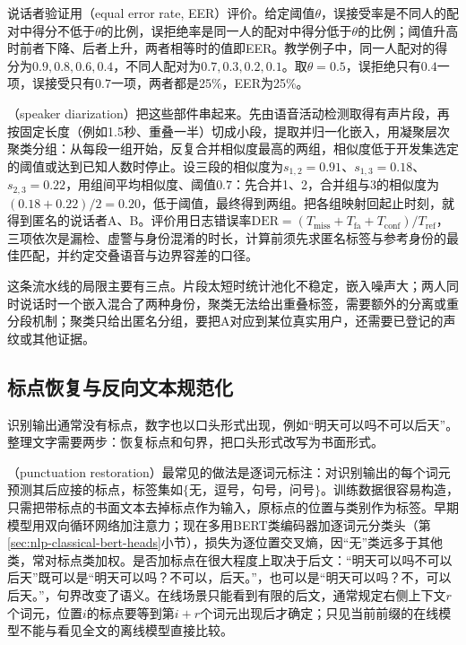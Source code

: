 说话者验证用（equal error rate, EER）评价。给定阈值$\theta$，误接受率是不同人的配对中得分不低于$\theta$的比例，误拒绝率是同一人的配对中得分低于$\theta$的比例；阈值升高时前者下降、后者上升，两者相等时的值即EER。教学例子中，同一人配对的得分为$0.9,0.8,0.6,0.4$，不同人配对为$0.7,0.3,0.2,0.1$。取$\theta=0.5$，误拒绝只有$0.4$一项，误接受只有$0.7$一项，两者都是25\%，EER为25\%。

（speaker diarization）把这些部件串起来。先由语音活动检测取得有声片段，再按固定长度（例如1.5秒、重叠一半）切成小段，提取并归一化嵌入，用凝聚层次聚类分组：从每段一组开始，反复合并相似度最高的两组，相似度低于开发集选定的阈值或达到已知人数时停止。设三段的相似度为$s_{1,2}=0.91$、$s_{1,3}=0.18$、$s_{2,3}=0.22$，用组间平均相似度、阈值$0.7$：先合并1、2，合并组与3的相似度为$(0.18+0.22)/2=0.20$，低于阈值，最终得到两组。把各组映射回起止时刻，就得到匿名的说话者A、B。评价用日志错误率$\mathrm{DER}=(T_{\mathrm{miss}}+T_{\mathrm{fa}}+T_{\mathrm{conf}})/T_{\mathrm{ref}}$，三项依次是漏检、虚警与身份混淆的时长，计算前须先求匿名标签与参考身份的最佳匹配，并约定交叠语音与边界容差的口径。

这条流水线的局限主要有三点。片段太短时统计池化不稳定，嵌入噪声大；两人同时说话时一个嵌入混合了两种身份，聚类无法给出重叠标签，需要额外的分离或重分段机制；聚类只给出匿名分组，要把A对应到某位真实用户，还需要已登记的声纹或其他证据。

\subsection{标点恢复与反向文本规范化}
\label{sec:nlp-speech-itn}

识别输出通常没有标点，数字也以口头形式出现，例如“明天可以吗不可以后天”。整理文字需要两步：恢复标点和句界，把口头形式改写为书面形式。

（punctuation restoration）最常见的做法是逐词元标注：对识别输出的每个词元预测其后应接的标点，标签集如$\{$无，逗号，句号，问号$\}$。训练数据很容易构造，只需把带标点的书面文本去掉标点作为输入，原标点的位置与类别作为标签。早期模型用双向循环网络加注意力；现在多用BERT类编码器加逐词元分类头（第\ref{sec:nlp-classical-bert-heads}小节），损失为逐位置交叉熵，因“无”类远多于其他类，常对标点类加权。是否加标点在很大程度上取决于后文：“明天可以吗不可以后天”既可以是“明天可以吗？不可以，后天。”，也可以是“明天可以吗？不，可以后天。”，句界改变了语义。在线场景只能看到有限的后文，通常规定右侧上下文$r$个词元，位置$i$的标点要等到第$i+r$个词元出现后才确定；只见当前前缀的在线模型不能与看见全文的离线模型直接比较。

